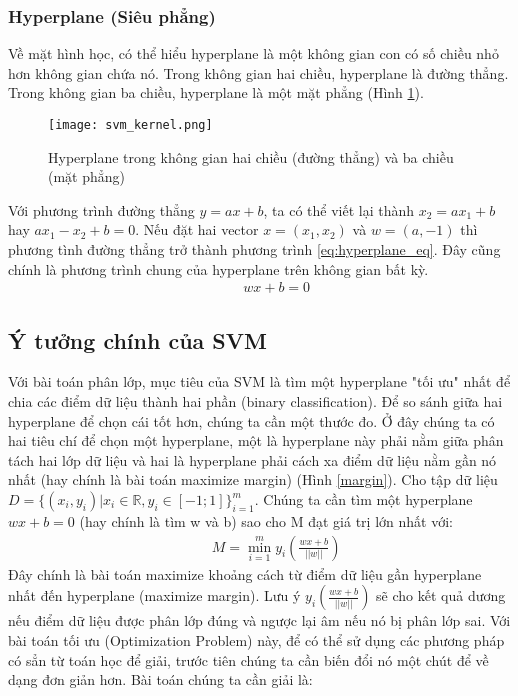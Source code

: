 \subsubsection*{Hyperplane (Siêu phẳng)}
Về mặt hình học, có thể hiểu hyperplane là một không gian con có số chiều nhỏ hơn không gian chứa nó. Trong không gian hai chiều, hyperplane là đường thẳng. Trong không gian ba chiều, hyperplane là một mặt phẳng (Hình \ref{fig:hyperplane}).
\begin{figure}[h!]
	\centering
	\captionsetup{width=0.8\textwidth}
	\texttt{[image: svm\_kernel.png]}
	\caption{Hyperplane trong không gian hai chiều (đường thẳng) và ba chiều (mặt phẳng)}
    \label{fig:hyperplane}
\end{figure}
Với phương trình đường thẳng $y = ax + b$, ta có thể viết lại thành $x_2 = ax_1 + b$ hay $ax_1 - x_2 + b = 0$. Nếu đặt hai vector $x = (x_1, x_2)$ và $w = (a, -1)$ thì phương tình đường thẳng trở thành phương trình \ref{eq:hyperplane_eq}. Đây cũng chính là phương trình chung của hyperplane trên không gian bất kỳ.
\begin{eqnarray}
\label{eq:hyperplane_eq}
\hspace{1cm} wx + b = 0
\end{eqnarray}

\subsection{Ý tưởng chính của SVM}
Với bài toán phân lớp, mục tiêu của SVM là tìm một hyperplane "tối ưu" nhất để chia các điểm dữ liệu thành hai phần (binary classification). Để so sánh giữa hai hyperplane để chọn cái tốt hơn, chúng ta cần một thước đo. Ở đây chúng ta có hai tiêu chí để chọn một hyperplane, một là hyperplane này phải nằm giữa phân tách hai lớp dữ liệu và hai là hyperplane phải cách xa điểm dữ liệu nằm gần nó nhất (hay chính là bài toán maximize margin) (Hình \ref{margin}).
\linebreak
Cho tập dữ liệu $D = \{(x_i, y_i) | x_i \in \mathbb{R}, y_i \in[-1; 1]\}_{i=1}^m$. Chúng ta cần tìm một hyperplane $wx + b =0$ (hay chính là tìm w và b) sao cho M đạt giá trị lớn nhất với:
\begin{eqnarray}
\label{eq:hyperplane_eq}
\hspace{1cm} M = \min_{i=1}^m {y_i(\frac{wx + b}{||w||})}
\end{eqnarray}
Đây chính là bài toán maximize khoảng cách từ điểm dữ liệu gần hyperplane nhất đến hyperplane (maximize margin). Lưu ý ${y_i(\frac{wx + b}{||w||})}$ sẽ cho kết quả dương nếu điểm dữ liệu được phân lớp đúng và ngược lại âm nếu nó bị phân lớp sai.
Với bài toán tối ưu (Optimization Problem) này, để có thể sử dụng các phương pháp có sẳn từ toán học để giải, trước tiên chúng ta cần biến đổi nó một chút để về dạng đơn giản hơn. 
Bài toán chúng ta cần giải là:

